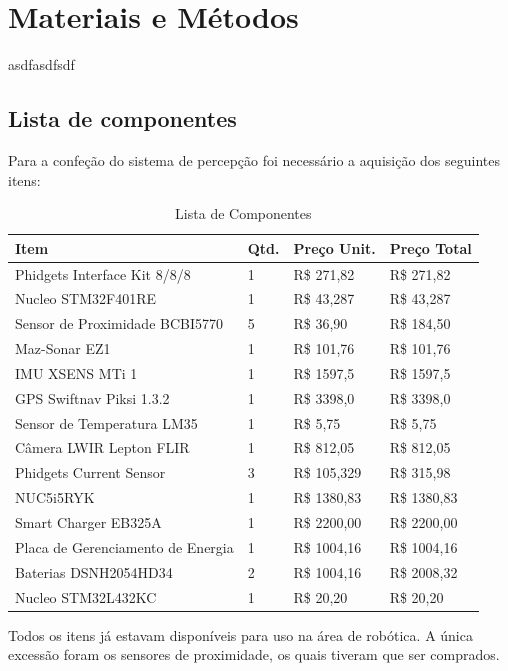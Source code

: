 \chapter{Materiais e Métodos}
\label{chap:mat}
asdfasdfsdf

\section{Lista de componentes}
\label{sec:espc}
Para a confeção do sistema de percepção foi necessário a aquisição dos seguintes itens:
\begin{table}[]
\centering
\begin{tabular}{|l|l|l|l|}
\hline
{Item}                           & {Qtd.} & {Preço Unit.} & {Preço Total}  \\ \hline
Phidgets Interface Kit 8/8/8     & 1  & R\$ 271,82  & R\$ 271,82  \\ \hline
Nucleo STM32F401RE               & 1  & R\$ 43,287  & R\$ 43,287  \\ \hline
Sensor de Proximidade BCBI5770   & 5  & R\$ 36,90   & R\$ 184,50  \\ \hline
Maz-Sonar EZ1                    & 1  & R\$ 101,76  & R\$ 101,76  \\ \hline
IMU XSENS MTi 1                  & 1  & R\$ 1597,5  & R\$ 1597,5  \\ \hline
GPS Swiftnav Piksi 1.3.2         & 1  & R\$ 3398,0  & R\$ 3398,0  \\ \hline
Sensor de Temperatura LM35       & 1  & R\$ 5,75    & R\$ 5,75    \\ \hline
Câmera LWIR Lepton FLIR          & 1  & R\$ 812,05  & R\$ 812,05  \\ \hline
Phidgets Current Sensor          & 3  & R\$ 105,329 & R\$ 315,98  \\ \hline
NUC5i5RYK                        & 1  & R\$ 1380,83 & R\$ 1380,83 \\ \hline
Smart Charger EB325A             & 1  & R\$ 2200,00 & R\$ 2200,00 \\ \hline
Placa de Gerenciamento de Energia & 1 & R\$ 1004,16 & R\$ 1004,16 \\ \hline
Baterias DSNH2054HD34            & 2  & R\$ 1004,16 & R\$ 2008,32 \\ \hline
Nucleo STM32L432KC                      & 1  & R\$ 20,20   & R\$ 20,20   \\ \hline
\end{tabular}

\caption{Lista de Componentes}
\end{table}
\pagebreak
Todos os itens já estavam disponíveis para uso na área de robótica. A única excessão foram os sensores de proximidade, os quais tiveram que ser comprados.



